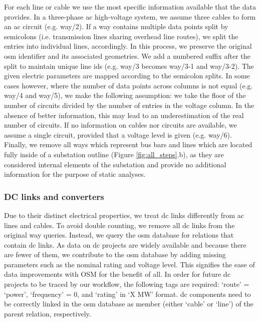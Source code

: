 \documentclass[fleqn,10pt]{wlscirep}
\let\autocite\cite
\begin{document}
For each line or cable we use the most specific information available that the data provides. In a three-phase \acrshort{ac} high-voltage system, we assume three cables to form an \acrshort{ac} circuit (e.g. way/2).\autocite{kirschenPowerSystemsFundamental2024} If a way contains multiple data points split by semicolons (i.e. transmission lines sharing overhead line routes), we split the entries into individual lines, accordingly. In this process, we preserve the original \gls{osm} identifier and its associated geometries. We add a numbered suffix after the split to maintain unique line ids (e.g. way/3 becomes way/3-1 and way/3-2). The given electric parameters are mapped according to the semicolon splits. In some cases however, where the number of data points across columns is not equal (e.g. way/4 and way/5), we make the following assumption: we take the floor of the number of circuits divided by the number of entries in the voltage column. In the absence of better information, this may lead to an underestimation of the real number of circuits. If no information on cables nor circuits are available, we assume a single circuit, provided that a voltage level is given (e.g. way/6). Finally, we remove all ways which represent bus bars and lines which are located fully inside of a substation outline (Figure \ref{fig:all_steps}.b), as they are considered internal elements of the substation and provide no additional information for the purpose of static analyses.
\subsubsection*{DC links and converters}
Due to their distinct electrical properties, we treat \acrshort{dc} links differently from \acrshort{ac} lines and cables. To avoid double counting, we remove all \acrshort{dc} links from the original way queries. Instead, we query the \gls{osm} database for relations that contain \acrshort{dc} links. As data on \acrshort{dc} projects are widely available and because there are fewer of them,\autocite{entso-eENTSOETransmissionSystem,pierriChallengesOpportunitiesEuropean2017} we contribute to the \gls{osm} database by adding missing parameters such as the nominal rating and voltage level. This signifies the ease of data improvements with OSM for the benefit of all. In order for future \acrshort{dc} projects to be traced by our workflow, the following tags are required: `route' = `power', `frequency' = 0, and `rating' in `X MW' format. \acrshort{dc} components need to be correctly linked in the \acrshort{osm} database as member (either `cable' or `line') of the parent relation, respectively.
\end{document}
